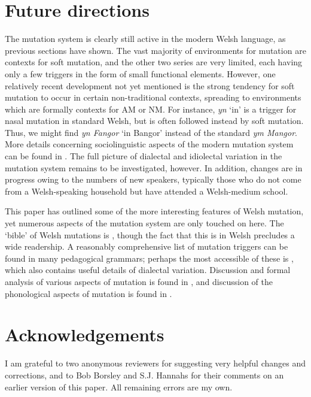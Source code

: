 \documentclass[output=paper,colorlinks,citecolor=brown]{langscibook}
\begin{document}


\section{Future directions}\label{sec:tallerman:6}

The mutation system is clearly still active in the modern Welsh language, as previous sections have shown. The vast majority of environments for mutation are contexts for soft mutation, and the other two series are very limited, each having only a few triggers in the form of small functional elements. However, one relatively recent development not yet mentioned is the strong tendency for soft mutation to occur in certain non-traditional contexts, spreading to environments which are formally contexts for AM or NM. For instance, \textit{yn} ‘in’ is a trigger for nasal mutation in standard Welsh, but is often followed instead by soft mutation. Thus, we might find \textit{yn Fangor} ‘in Bangor’ instead of the standard \textit{ym Mangor}. More details concerning sociolinguistic aspects of the modern mutation system can be found in \citet{Webb-DaviesToAppear}. The full picture of dialectal and idiolectal variation in the mutation system remains to be investigated, however. In addition, changes are in progress owing to the numbers of new speakers, typically those who do not come from a Welsh-speaking household but have attended a Welsh-medium school.

This paper has outlined some of the more interesting features of Welsh mutation, yet numerous aspects of the mutation system are only touched on here. The ‘bible’ of Welsh mutations is \citet{Morgan1952}, though the fact that this is in Welsh precludes a wide readership. A reasonably comprehensive list of mutation triggers can be found in many pedagogical grammars; perhaps the most accessible of these is \citet{King2015}, which also contains useful details of dialectal variation. Discussion and formal analysis of various aspects of mutation is found in \citet{BorsleyEtAl2007}, and discussion of the phonological aspects of mutation is found in \citet{Hannahs2013}.

\section*{Acknowledgements}
I am grateful to two anonymous reviewers for suggesting very helpful changes and corrections, and to Bob Borsley and S.J. Hannahs for their comments on an earlier version of this paper. All remaining errors are my own.

\sloppy
\printbibliography[heading=subbibliography,notkeyword=this]
\end{document}
